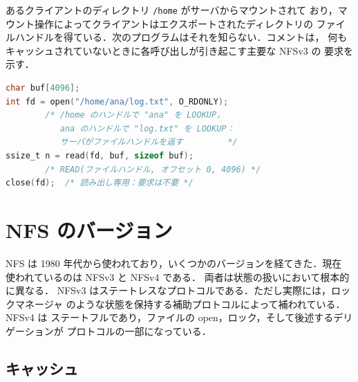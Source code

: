 \documentclass[../main.tex]{subfiles}
\begin{document}
\begin{example}
  あるクライアントのディレクトリ \texttt{/home} がサーバからマウントされて
  おり，マウント操作によってクライアントはエクスポートされたディレクトリの
  ファイルハンドルを得ている．次のプログラムはそれを知らない．コメントは，
  何もキャッシュされていないときに各呼び出しが引き起こす主要な NFSv3 の
  要求を示す．
  \begin{lstlisting}[language=C, numbers=none]
char buf[4096];
int fd = open("/home/ana/log.txt", O_RDONLY);
        /* /home のハンドルで "ana" を LOOKUP，
           ana のハンドルで "log.txt" を LOOKUP：
           サーバがファイルハンドルを返す         */
ssize_t n = read(fd, buf, sizeof buf);
        /* READ(ファイルハンドル, オフセット 0, 4096) */
close(fd);  /* 読み出し専用：要求は不要 */
\end{lstlisting}
\end{example}

\section{NFS のバージョン}
\label{sec:l14-nfs-versions}

NFS は 1980 年代から使われており，いくつかのバージョンを経てきた．現在
使われているのは NFSv3 \cite{rfc1813} と NFSv4 \cite{rfc7530} である．
両者は状態の扱いにおいて根本的に異なる．
NFSv3 はステートレスなプロトコルである．ただし実際には，ロックマネージャ
のような状態を保持する補助プロトコルによって補われている．NFSv4 は
ステートフルであり，ファイルの open，ロック，そして後述するデリゲーションが
プロトコルの一部になっている．

\subsection{キャッシュ}
\end{document}
